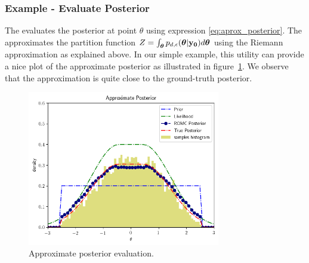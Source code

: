 \subsubsection*{Example - Evaluate Posterior}

The  evaluates the
posterior at point $\theta$ using expression
\eqref{eq:aprox_posterior}. The 
approximates the partition function
$Z = \int_{\boldsymbol{\theta}} p_{d,\epsilon}(\boldsymbol{\theta}|\mathbf{y_0}) d\boldsymbol{\theta}$ using the
Riemann approximation as explained above. In our simple example, this
utility can provide a nice plot of the approximate posterior as
illustrated in figure~\ref{fig:approx_posterior}. We observe that the
approximation is quite close to the ground-truth posterior.

\begin{figure}[ht]
    \begin{center}
      \includegraphics[width=0.75\textwidth]{./Thesis/images/chapter3/example_posterior.png}
    \end{center}
  \caption[Approximate posterior evaluation, at the 1D example.]{Approximate posterior evaluation.}
  \label{fig:approx_posterior}
\end{figure}
